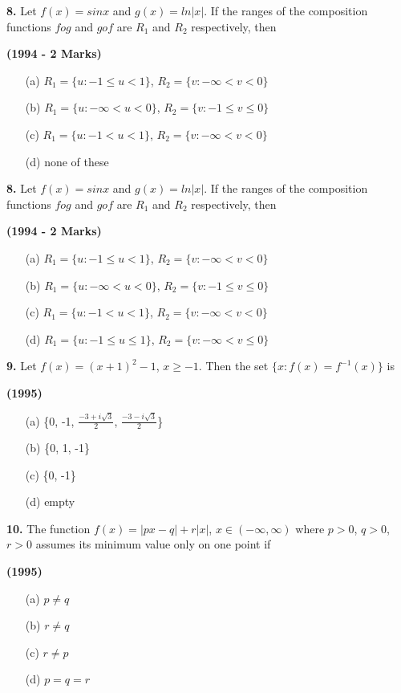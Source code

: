 \documentclass[journal,12pt,twocolumn]{IEEEtran}
\theoremstyle{remark}
\begin{document}
\textbf{8.} Let $f(x)=sinx$ and $g(x)=ln|x|$. If the ranges of the composition functions $fog$ and $gof$ are $R_1$ and $R_2$ respectively, then 

\hfill{\textbf{(1994 - 2 Marks)}}

\begin{enumerate}
\item[(a)] $R_1=\{u:-1\le u<1\}$, $R_2=\{v:-\infty<v<0\}$
\item[(b)] $R_1=\{u:-\infty<u<0\}$, $R_2=\{v:-1\le v\le0\}$
\item[(c)] $R_1=\{u:-1<u<1\}$, $R_2=\{v:-\infty<v<0\}$
\item[(d)] none of these
\end{enumerate}

\textbf{8.} Let $f(x)=sinx$ and $g(x)=ln|x|$. If the ranges of the composition functions $fog$ and $gof$ are $R_1$ and $R_2$ respectively, then 

\hfill{\textbf{(1994 - 2 Marks)}}

\begin{enumerate}
\item[(a)] $R_1=\{u:-1\le u<1\}$, $R_2=\{v:-\infty<v<0\}$
\item[(b)] $R_1=\{u:-\infty<u<0\}$, $R_2=\{v:-1\le v\le0\}$
\item[(c)] $R_1=\{u:-1<u<1\}$, $R_2=\{v:-\infty<v<0\}$
\item[(d)] $R_1=\{u:-1\le u\le1\}$, $R_2=\{v:-\infty<v\le0\}$
\end{enumerate}

\textbf{9.} Let $f(x)=(x+1)^{2}-1$, $x\ge-1$. Then the set $\{x:f(x)=f^{-1}(x)\}$ is

\hfill{\textbf{(1995)}}

\begin{enumerate}
\item[(a)] \{0, -1, $\frac{-3+i\sqrt{3}}{2}$, $\frac{-3-i\sqrt{3}}{2}$\}
\item[(b)] \{0, 1, -1\}
\item[(c)] \{0, -1\}
\item[(d)] empty
\end{enumerate}

\textbf{10.} The function $f(x)=|px-q|+r|x|$, $x\in(-\infty,\infty)$ where $p>0$, $q>0$, $r>0$ assumes its minimum value only on one point if

\hfill{\textbf{(1995)}}

\begin{enumerate}
\item[(a)] $p\neq q$
\item[(b)] $r\neq q$
\item[(c)] $r\neq p$
\item[(d)] $p=q=r$
\end{enumerate}
\end{document}
